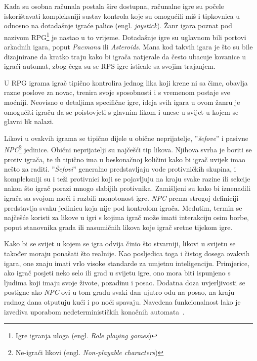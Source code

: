 \documentclass[times, utf8, zavrsni, numeric]{fer}
\begin{document}
\par Kada su osobna računala postala šire dostupna, računalne igre su počele iskorištavati kompleksniji sustav kontrola koje su omogućili miš i tipkovnica u odnosno na dotadašnje igraće palice (engl. \textit{joystick}).
Žanr igara poznat pod nazivom RPG\footnote{Igre igranja uloga (engl. \textit{Role playing games})} je nastao u to vrijeme.
Dotadašnje igre su uglavnom bili portovi arkadnih igara, poput \textit{Pacmana} ili \textit{Asteroids}.
Mana kod takvih igara je što su bile dizajnirane da kratko traju kako bi igrača natjerale da često ubacuje kovanice u igraći automat, zbog čega su se RPS igre isticale sa svojim trajanjem.

\par U RPG igrama igrač tipično kontrolira jednog lika koji krene ni sa čime, obavlja razne poslove za novac, trenira svoje sposobnosti i s vremenom postaje sve moćniji. 
Neovisno o detaljima specifične igre, ideja svih igara u ovom žanru je omogućiti igraču da se poistovjeti s glavnim likom i unese u svijet u kojem se glavni lik nalazi.

\par Likovi u ovakvih igrama se tipično dijele u obične neprijatelje, ''\textit{šefove}'' i pasivne \textit{NPC}\footnote{Ne-igraći likovi         
(engl. \textit{Non-playable characters})} jedinice.
Obični neprijatelji su najčešći tip likova.
Njihova svrha je boriti se protiv igrača, te ih tipično ima u beskonačnoj količini kako bi igrač uvijek imao nešto za raditi.
''\textit{Šefovi}'' generalno predstavljaju vođe protivničkih skupina, i kompleksniji su i teži protivnici koji se pojavljuju na kraju svake razine ili sekcije nakon što igrač porazi mnogo slabijih protivnika.
Zamišljeni su kako bi iznenadili igrača sa svojom moći i razbili monotonost igre.
\textit{NPC} prema strogoj definiciji predstavlja svaku jedinicu koja nije pod kontrolom igrača. 
Međutim, termin se najčešće koristi za likove u igri s kojima igrač može imati interakciju osim borbe, poput stanovnika grada ili nasumičnih likova koje igrač sretne tijekom igre.

\par Kako bi se svijet u kojem se igra odvija činio što stvarniji, likovi u svijetu se također moraju ponašati što realnije.
Kao posljedica toga i čistog dosega ovakvih igara, one znaju imati vrlo visoke standarde za umjetnu inteligenciju.
Primjerice, ako igrač posjeti neko selo ili grad u svijetu igre, ono mora biti ispunjeno s ljudima koji imaju svoje živote, pozadinu i posao.
Dodatna doza uvjerljivosti se postigne ako \textit{NPC}-ovi u tom gradu svaki dan ujutro odu na posao, na kraju radnog dana otputuju kući i po noći spavaju.
Navedena funkcionalnost lako je izvediva uporabom nedeterminističkih konačnih automata~\cite{book:AIGameProgrammingWisdom}.
\end{document}
